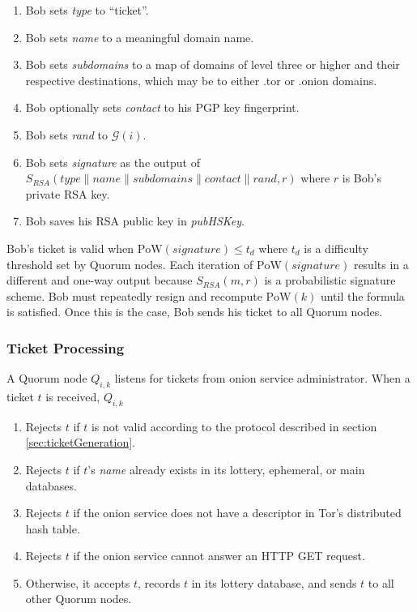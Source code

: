 \documentclass[USenglish,oneside,twocolumn]{article}
\newcommand*\concat{\mathbin{\|}}
\begin{document}
\begin{enumerate}
	\item Bob sets \emph{type} to ``ticket''.
	\item Bob sets \emph{name} to a meaningful domain name.
	\item Bob sets \emph{subdomains} to a map of domains of level three or higher and their respective destinations, which may be to either .tor or .onion domains.
	\item Bob optionally sets \emph{contact} to his PGP key fingerprint.
	\item Bob sets \emph{rand} to $ \mathcal{G}(i) $.
	\item Bob sets \emph{signature} as the output of $ S_{\mathit{RSA}}(\mathit{type} \concat \mathit{name} \concat \mathit{subdomains} \concat \mathit{contact} \concat \mathit{rand}, r) $ where $ r $ is Bob's private RSA key.
	\item Bob saves his RSA public key in \emph{pubHSKey}.
\end{enumerate}

Bob's ticket is valid when $ \mathrm{PoW}(\mathit{signature}) \leq t_{d} $ where $ t_{d} $ is a difficulty threshold set by Quorum nodes. Each iteration of $ \mathrm{PoW}(\mathit{signature}) $ results in a different and one-way output because $ S_{\mathit{RSA}}(m, r) $ is a probabilistic signature scheme. Bob must repeatedly resign and recompute $ \mathrm{PoW}(k) $ until the formula is satisfied. Once this is the case, Bob sends his ticket to all Quorum nodes.

\subsubsection{Ticket Processing}

A Quorum node $ Q_{i,k} $ listens for tickets from onion service administrator. When a ticket $ t $ is received, $ Q_{i,k} $

\begin{enumerate}
	\item Rejects $ t $ if $ t $ is not valid according to the protocol described in section \ref{sec:ticketGeneration}.
	\item Rejects $ t $ if $ t $'s \emph{name} already exists in its lottery, ephemeral, or main databases.
	\item Rejects $ t $ if the onion service does not have a descriptor in Tor's distributed hash table.
	\item Rejects $ t $ if the onion service cannot answer an HTTP GET request.
	\item Otherwise, it accepts $ t $, records $ t $ in its lottery database, and sends $ t $ to all other Quorum nodes.
\end{enumerate}
\end{document}
